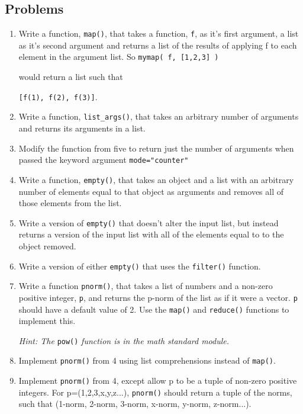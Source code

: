 \subsection{Problems}
\begin{enumerate}
	\item Write a function, \verb|map()|, that takes a function, \verb|f|, as it's first argument, a list as it's second argument and returns a list of the results of applying f to each element in the argument list. So \verb|mymap( f, [1,2,3] )|

would return a list such that

\verb|[f(1), f(2), f(3)]|.

	\item Write a function, \verb|list_args()|, that takes an arbitrary number of arguments and returns its arguments in a list.
	\item Modify the function from five to return just the number of arguments when passed the keyword argument
\verb|mode="counter"|

	\item Write a function, \verb|empty()|, that takes an object and a list with an arbitrary number of elements equal to that object as arguments and removes all of those elements from the list.

	\item Write a version of \verb|empty()| that doesn't alter the input list, but instead returns a version of the input list with all of the elements equal to to the object removed.

	\item Write a version of either \verb|empty()| that uses the \verb|filter()| function.

	\item Write a function \verb|pnorm()|, that takes a list of numbers and a non-zero positive integer, \verb|p|, and returns the p-norm of the list as if it were a vector. \verb|p| should have a default value of 2. Use the \verb|map()| and \verb|reduce()| functions to implement this.

\emph{Hint: The }\verb|pow()| \emph{function is in the math standard module.}

	\item Implement \verb|pnorm()| from 4 using list comprehensions instead of \verb|map()|.

	\item Implement \verb|pnorm()| from 4, except allow p to be a tuple of non-zero positive integers. For p=(1,2,3,x,y,z...), \verb|pnorm()| should return a tuple of the norms, such that (1-norm, 2-norm, 3-norm, x-norm, y-norm, z-norm...).


\end{enumerate}

